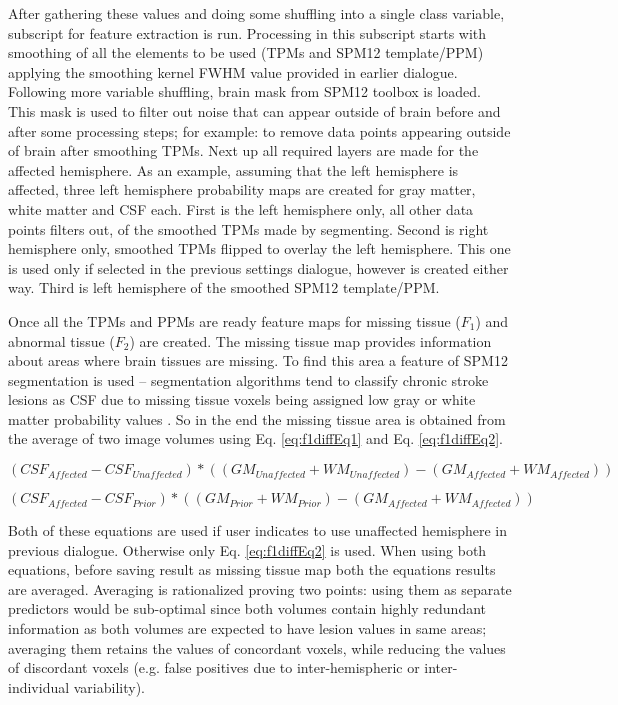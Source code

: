 \documentclass[12pt]{article}
\begin{document}
After gathering these values and doing some shuffling into a single class variable, subscript for feature extraction is run. Processing in this subscript starts with smoothing of all the elements to be used (TPMs and SPM12 template/PPM) applying the smoothing kernel FWHM value provided in earlier dialogue. Following more variable shuffling, brain mask from SPM12 toolbox is loaded. This mask is used to filter out noise that can appear outside of brain before and after some processing steps; for example: to remove data points appearing outside of brain after smoothing TPMs. Next up all required layers are made for the affected hemisphere. As an example, assuming that the left hemisphere is affected, three left hemisphere probability maps are created for gray matter, white matter and CSF each. First is the left hemisphere only, all other data points filters out, of the smoothed TPMs made by segmenting. Second is right hemisphere only, smoothed TPMs flipped to overlay the left hemisphere. This one is used only if selected in the previous settings dialogue, however is created either way. Third is left hemisphere of the smoothed SPM12 template/PPM.

Once all the TPMs and PPMs are ready feature maps for missing tissue ($F_1$) and abnormal tissue ($F_2$) are created. The missing tissue map provides information about areas where brain tissues are missing. To find this area a feature of SPM12 segmentation is used – segmentation algorithms tend to classify chronic stroke lesions as CSF due to missing tissue voxels being assigned low gray or white matter probability values \cite{seghier2008lesion, wilke2011manual}. So in the end the missing tissue area is obtained from the average of two image volumes using Eq. \ref{eq:f1diffEq1} and Eq. \ref{eq:f1diffEq2}.

\begin{equation}
\label{eq:f1diffEq1}
(CSF_{Affected}-CSF_{Unaffected})*((GM_{Unaffected}+WM_{Unaffected})-(GM_{Affected}+WM_{Affected}))
\end{equation}

\begin{equation}
\label{eq:f1diffEq2}
(CSF_{Affected}-CSF_{Prior})*((GM_{Prior}+WM_{Prior})-(GM_{Affected}+WM_{Affected}))
\end{equation}

Both of these equations are used if user indicates to use unaffected hemisphere in previous dialogue. Otherwise only Eq. \ref{eq:f1diffEq2} is used. When using both equations, before saving result as missing tissue map both the equations results are averaged. Averaging is rationalized proving two points: using them as separate predictors would be sub-optimal since both volumes contain highly redundant information as both volumes are expected to have lesion values in same areas; averaging them retains the values of concordant voxels, while reducing the values of discordant voxels (e.g. false positives due to inter-hemispheric or inter-individual variability)\cite{griffis2016voxel}.
\end{document}
